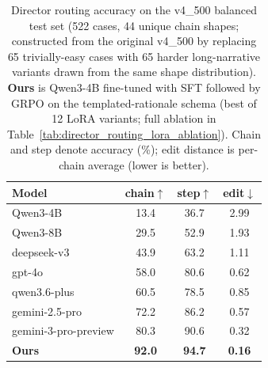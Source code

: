 \begin{table}[!ht]
\centering
\caption{Director routing accuracy on the v4\_500 balanced test set (522 cases, 44 unique chain shapes; constructed from the original v4\_500 by replacing 65 trivially-easy cases with 65 harder long-narrative variants drawn from the same shape distribution). \textbf{Ours} is Qwen3-4B fine-tuned with SFT followed by GRPO on the templated-rationale schema (best of 12 LoRA variants; full ablation in Table~\ref{tab:director_routing_lora_ablation}). Chain and step denote accuracy (\%); edit distance is per-chain average (lower is better).}
\label{tab:director_routing_balanced}
\small
\setlength{\tabcolsep}{4.5pt}
\begin{tabular}{l|ccc}
\toprule
Model & chain$\uparrow$ & step$\uparrow$ & edit$\downarrow$ \\
\midrule
Qwen3-4B & 13.4 & 36.7 & 2.99 \\
Qwen3-8B & 29.5 & 52.9 & 1.93 \\
\midrule
deepseek-v3 & 43.9 & 63.2 & 1.11 \\
gpt-4o & 58.0 & 80.6 & 0.62 \\
qwen3.6-plus & 60.5 & 78.5 & 0.85 \\
\midrule
gemini-2.5-pro & 72.2 & 86.2 & 0.57 \\
gemini-3-pro-preview & 80.3 & 90.6 & 0.32 \\
\midrule
\textbf{Ours} & \textbf{92.0} & \textbf{94.7} & \textbf{0.16} \\
\bottomrule
\end{tabular}
\end{table}
